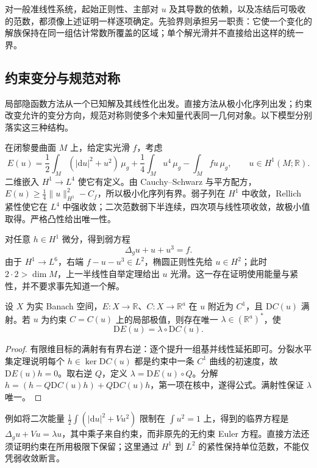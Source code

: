 对一般准线性系统，起始正则性、主部对 \(u\) 及其导数的依赖，以及冻结后可吸收的范数，都须像上述证明一样逐项确定。先验界则承担另一职责：它使一个变化的解族保持在同一组估计常数所覆盖的区域；单个解光滑并不直接给出这样的统一界。

\subsection{约束变分与规范对称}
\label{g3:subsec:1306:06}
局部隐函数方法从一个已知解及其线性化出发。直接方法从极小化序列出发；约束改变允许的变分方向，规范对称则使多个未知量代表同一几何对象。以下模型分别落实这三种结构。

\begin{example}\label{g3:exm:semilinear-convex-minimization}
	在闭黎曼曲面 \(M\) 上，给定实光滑 \(f\)，考虑
	\[
		E(u)=\frac12\int_M(|\mathrm du|^2+u^2)\,\mu_g
		+\frac14\int_Mu^4\,\mu_g-\int_Mfu\,\mu_g,
		\qquad u\in H^1(M;\mathbb R).
	\]
	二维嵌入 \(H^1\to L^4\) 使它有定义。由 Cauchy--Schwarz 与平方配方，\(E(u)\ge\tfrac14\|u\|_{H^1}^2-C_f\)，所以极小化序列有界。弱子列在 \(H^1\) 中收敛，Rellich 紧性使它在 \(L^4\) 中强收敛；二次范数弱下半连续，四次项与线性项收敛，故极小值取得。严格凸性给出唯一性。

	对任意 \(h\in H^1\) 微分，得到弱方程
	\[
		\Delta_gu+u+u^3=f.
	\]
	由于 \(H^1\to L^6\)，右端 \(f-u-u^3\in L^2\)，椭圆正则性先给 \(u\in H^2\)；此时 \(2\cdot2>\dim M\)，上一半线性自举定理给出 \(u\) 光滑。这一存在证明使用能量与紧性，并不要求事先知道一个解。
\end{example}

\begin{proposition}\label{g3:prop:constraint-lagrange-banach}
	设 \(X\) 为实 Banach 空间，\(E:X\to\mathbb R\)、\(C:X\to\mathbb R^a\) 在 \(u\) 附近为 \(C^1\)，且 \(\mathrm DC(u)\) 满射。若 \(u\) 为约束 \(C=C(u)\) 上的局部极值，则存在唯一 \(\lambda\in(\mathbb R^a)^*\)，使
	\[
		\mathrm DE(u)=\lambda\circ\mathrm DC(u).
	\]
\end{proposition}
\begin{proof}
	有限维目标的满射有有界右逆：逐个提升一组基并线性延拓即可。分裂水平集定理说明每个 \(h\in\ker\mathrm DC(u)\) 都是约束中一条 \(C^1\) 曲线的初速度，故 \(\mathrm DE(u)h=0\)。取右逆 \(Q\)，定义 \(\lambda=\mathrm DE(u)\circ Q\)。分解
	\(h=(h-Q\mathrm DC(u)h)+Q\mathrm DC(u)h\)，第一项在核中，遂得公式。满射性保证 \(\lambda\) 唯一。
\end{proof}

例如将二次能量 \(\tfrac12\int(|\mathrm du|^2+Vu^2)\) 限制在 \(\int u^2=1\) 上，得到的临界方程是 \(\Delta_gu+Vu=\lambda u\)，其中乘子来自约束，而非原先的无约束 Euler 方程。直接方法还须证明约束在所用极限下保留；这里通过 \(H^1\) 到 \(L^2\) 的紧性保持单位范数，不能仅凭弱收敛断言。

